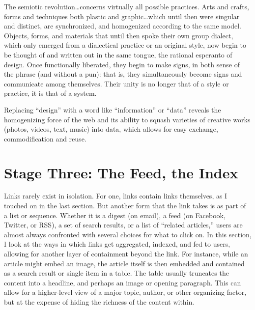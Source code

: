 The semiotic revolution…concerns virtually all possible practices. Arts and crafts, forms and techniques both plastic and graphic…which until then were singular and distinct, are synchronized, and homogenized according to the same model. Objects, forms, and materials that until then spoke their own group dialect, which only emerged from a dialectical practice or an original style, now begin to be thought of and written out in the same tongue, the rational esperanto of design. Once functionally liberated, they begin to make signs, in both sense of the phrase (and without a pun): that is, they simultaneously become  signs and communicate among themselves. Their unity is no longer that of a style or practice, it is that of a system. 

Replacing ``design'' with a word like ``information'' or ``data'' reveals the homogenizing force of the web and its ability to squash varieties of creative works (photos, videos, text, music) into data, which allows for easy exchange, commodification and reuse.

\section{Stage Three: The Feed, the Index}

Links rarely exist in isolation. For one, links contain links themselves, as I touched on in the last section. But another form that the link takes is as part of a list or sequence. Whether it is a digest (on email), a feed (on Facebook, Twitter, or RSS), a set of search results, or a list of ``related articles,'' users are almost always confronted with several choices for what to click on. In this section, I look at the ways in which links get aggregated, indexed, and fed to users, allowing for another layer of containment beyond the link. For instance, while an article might embed an image, the article itself is then embedded and contained as a search result or single item in a table. The table usually truncates the content into a headline, and perhaps an image or opening paragraph. This can allow for a higher-level view of a major topic, author, or other organizing factor, but at the expense of hiding the richness of the content within.

